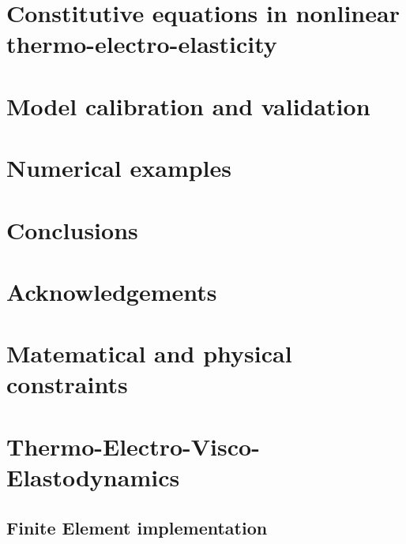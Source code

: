 \documentclass[preprint,12pt]{elsarticle}
\begin{document}
\section{Constitutive equations in nonlinear thermo-electro-elasticity}\label{sec:constitutive equations}


\section{Model calibration and validation}\label{sec:calibration}


\section{Numerical examples}\label{sec:numerical examples}


\clearpage

\section{Conclusions}\label{sec:conclusions}


\section{Acknowledgements}\label{sec:acknowledgements}


\newpage
\appendix
\section{Matematical and physical constraints}\label{sec:constraints}


\section{Thermo-Electro-Visco-Elastodynamics}\label{sec:dynamics}


\subsection{Finite Element implementation}\label{sec:FEM residuals}


\newpage



\end{document}
